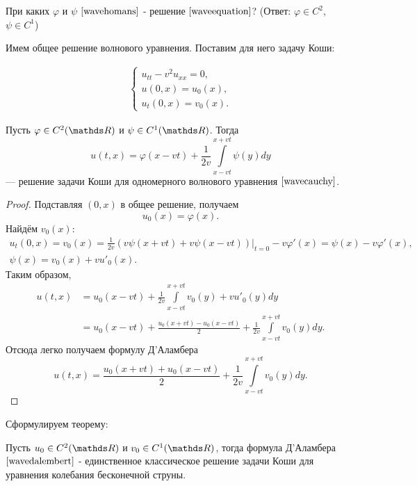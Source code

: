 \begin{exercise}
При каких $\varphi$ и $\psi$ $\eqref{wavehomans}$ - решение $\eqref{waveequation}$? (Ответ: $\varphi \in C^2$, $\psi \in C^1$)
\end{exercise}

Имем общее решение волнового уравнения. Поставим для него задачу Коши:

\begin{align}
    \begin{cases} 
        u_{tt} - v^2 u_{xx} = 0, \\
        u (0, x) = u_0 (x), \\
        u_t(0,x) = v_0 (x).
    \end{cases}
\label{wavecauchy}
\end{align}

\begin{theorem} Пусть $\varphi \in C^2(\real)$ и $\psi \in C^1(\real)$. Тогда
$$ u(t, x) = \varphi (x - vt) + \frac {1} {2v} \int \limits_{x - vt}^{x+vt} \psi (y) dy$$
--- решение задачи Коши для одномерного волнового уравнения $\ref{wavecauchy}$.
\end{theorem}
\begin{proof}
Подставляя $(0,x)$ в общее решение, получаем $$ u_0(x) = \varphi(x) .$$ Найдём $v_0(x)$:
\begin{gather*}
	u_t(0,x) = v_0(x) = \frac {1} {2v} (v \psi (x + vt) + v \psi (x - vt)) \Bigg\rvert_{t = 0} - v \varphi' (x)
	= \psi(x) - v \varphi'(x), \\
	\psi(x) = v_0(x) + v u'_0(x).
\end{gather*}
Таким образом,
\begin{align*}
	u(t,x) &= u_0(x-vt) + \frac {1} {2v} \int \limits_{x-vt}^{x+vt} v_0(y) + vu'_0(y)dy \\
	&= u_0(x-vt) + \frac {u_0(x+vt) - u_0(x-vt)} { 2} + \frac {1} {2v} \int \limits_{x-vt}^{x+vt} v_0(y)dy.
\end{align*}
Отсюда легко получаем формулу Д'Аламбера
\begin{equation}
	u(t,x) = \frac {u_0(x+vt) + u_0(x-vt)} { 2} + \frac {1} {2v} \int \limits_{x-vt}^{x+vt} v_0(y)dy.
\label{wavedalembert}
\end{equation}
\end{proof}

Сформулируем теорему:
\begin{theorem} Пусть $u_0 \in C^2(\real)$ и $v_0 \in C^1(\real)$, тогда формула Д'Аламбера $\eqref{wavedalembert}$ - единственное классическое решение задачи Коши для уравнения колебания бесконечной струны.
\end{theorem}


